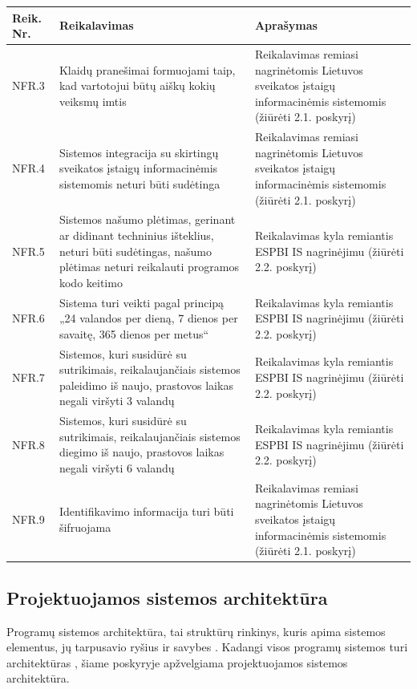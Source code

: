 \begin{table}[!ht]
    \centering
    \renewcommand{\arraystretch}{1.2}
    \renewcommand\thetable{6}

    \begin{tabular}{|m{3em}|m{17em}|m{17em}|}
    \hline 
    \rowcolor[HTML]{EFEFEF} 
    Reik. Nr. & Reikalavimas & Aprašymas \\ \hline
    NFR.3  & Klaidų pranešimai formuojami taip, kad vartotojui būtų aiškų kokių veiksmų imtis  &   Reikalavimas remiasi nagrinėtomis Lietuvos sveikatos įstaigų informacinėmis sistemomis (žiūrėti 2.1. poskyrį)       \\ \hline
    NFR.4  &  Sistemos integracija su skirtingų sveikatos įstaigų informacinėmis sistemomis neturi būti sudėtinga  &   Reikalavimas remiasi nagrinėtomis Lietuvos sveikatos įstaigų informacinėmis sistemomis (žiūrėti 2.1. poskyrį)       \\ \hline
    NFR.5  &  Sistemos našumo plėtimas, gerinant ar didinant techninius išteklius, neturi būti sudėtingas, našumo plėtimas neturi reikalauti programos kodo keitimo  &   Reikalavimas kyla remiantis ESPBI IS nagrinėjimu (žiūrėti 2.2. poskyrį)       \\ \hline
    NFR.6  &   Sistema turi veikti pagal principą „24 valandos per dieną, 7 dienos per savaitę, 365 dienos per metus“  &  Reikalavimas kyla remiantis ESPBI IS nagrinėjimu (žiūrėti 2.2. poskyrį)       \\ \hline
    NFR.7  &  Sistemos, kuri susidūrė su sutrikimais, reikalaujančiais sistemos paleidimo iš naujo, prastovos laikas negali viršyti 3 valandų  &   Reikalavimas kyla remiantis ESPBI IS nagrinėjimu (žiūrėti 2.2. poskyrį)       \\ \hline
    NFR.8  &  Sistemos, kuri susidūrė su sutrikimais, reikalaujančiais sistemos diegimo iš naujo, prastovos laikas negali viršyti 6 valandų  &   Reikalavimas kyla remiantis ESPBI IS nagrinėjimu (žiūrėti 2.2. poskyrį)       \\ \hline
    NFR.9  &  Identifikavimo informacija turi būti šifruojama  &   Reikalavimas remiasi nagrinėtomis Lietuvos sveikatos įstaigų informacinėmis sistemomis (žiūrėti 2.1. poskyrį)       \\ \hline
    \end{tabular}

\end{table}

\subsection{Projektuojamos sistemos architektūra}
Programų sistemos architektūra, tai struktūrų rinkinys, kuris apima sistemos elementus, jų tarpusavio ryšius ir savybes \cite{Bass2013}. Kadangi visos programų sistemos turi architektūras \cite{Bass2013}, šiame poskyryje apžvelgiama projektuojamos sistemos architektūra.

